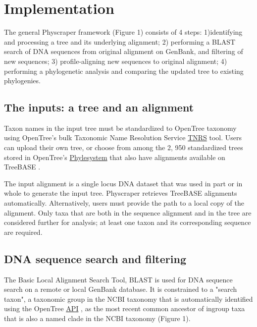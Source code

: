 \documentclass{bmcart}
\begin{document}
\section*{Implementation}

The general Physcraper framework (Figure 1) consists of 4 steps: 1)identifying and
processing a tree and its underlying alignment; 2) performing a BLAST search of
DNA sequences from original alignment on GenBank, and filtering of new sequences;
3) profile-aligning new sequences to original alignment; 4) performing a phylogenetic
analysis and comparing the updated tree to existing phylogenies.

\subsection*{The inputs: a tree and an alignment}

Taxon names in the input tree must be standardized to OpenTree taxonomy
\cite{rees2017automated} using OpenTree's bulk Taxonomic Name Resolution Service
\href{https://tree.opentreeoflife.org/curator/tnrs/}{TNRS} tool. Users can upload their
own tree, or choose from among the 2, 950 standardized trees stored in OpenTree's
\href{https://github.com/opentreeoflife/phylesystem}{Phylesystem} that also have
alignments available on TreeBASE \cite{piel2009treebase}.

The input alignment is a single locus DNA dataset that was used in part or in
whole to generate the input tree. Physcraper retrieves TreeBASE alignments
automatically. Alternatively, users must provide the path to a local copy of the
alignment.
Only taxa that are both in the sequence alignment and in the tree are considered
further for analysis; at least one taxon and its corresponding sequence are required.

\subsection*{DNA sequence search and filtering}

The Basic Local Alignment Search Tool, BLAST \cite{altschul1990basic} is used for DNA
sequence search on a remote or local GenBank database. It is constrained to a
"search taxon", a taxonomic group in the NCBI taxonomy that is automatically
identified using the OpenTree
\href{<https://github.com/OpenTreeOfLife/germinator/wiki/Taxonomy-API-v3#mrca>}{API}
\cite{rees2017automated}, as the most recent common ancestor of ingroup taxa that is
also a named clade in the NCBI taxonomy (Figure 1).
\end{document}
